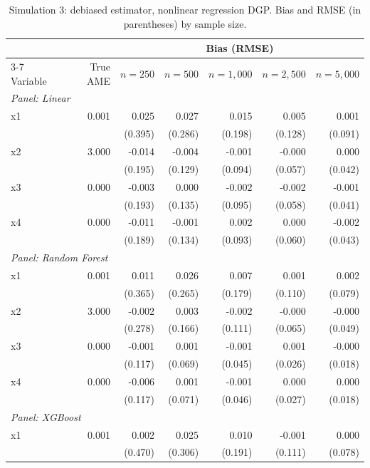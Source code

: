 \begin{table}[htbp]
\centering
\small
\begin{threeparttable}
\caption{Simulation 3: debiased estimator, nonlinear regression DGP. Bias and RMSE (in parentheses) by sample size.}
\label{tab:sim3_bias_regression_nonlinear}
\begin{tabular}{lrrrrrr}
\toprule
 & & \multicolumn{5}{c}{Bias (RMSE)} \\
\cmidrule(lr){3-7}
Variable & True AME & $n=250$ & $n=500$ & $n=1,000$ & $n=2,500$ & $n=5,000$ \\
\midrule
\multicolumn{7}{l}{\textit{Panel: Linear}} \\
\quad x1 & 0.001 & 0.025 & 0.027 & 0.015 & 0.005 & 0.001 \\
 &  & (0.395) & (0.286) & (0.198) & (0.128) & (0.091) \\
\quad x2 & 3.000 & -0.014 & -0.004 & -0.001 & -0.000 & 0.000 \\
 &  & (0.195) & (0.129) & (0.094) & (0.057) & (0.042) \\
\quad x3 & 0.000 & -0.003 & 0.000 & -0.002 & -0.002 & -0.001 \\
 &  & (0.193) & (0.135) & (0.095) & (0.058) & (0.041) \\
\quad x4 & 0.000 & -0.011 & -0.001 & 0.002 & 0.000 & -0.002 \\
 &  & (0.189) & (0.134) & (0.093) & (0.060) & (0.043) \\
\midrule
\multicolumn{7}{l}{\textit{Panel: Random Forest}} \\
\quad x1 & 0.001 & 0.011 & 0.026 & 0.007 & 0.001 & 0.002 \\
 &  & (0.365) & (0.265) & (0.179) & (0.110) & (0.079) \\
\quad x2 & 3.000 & -0.002 & 0.003 & -0.002 & -0.000 & -0.000 \\
 &  & (0.278) & (0.166) & (0.111) & (0.065) & (0.049) \\
\quad x3 & 0.000 & -0.001 & 0.001 & -0.001 & 0.001 & -0.000 \\
 &  & (0.117) & (0.069) & (0.045) & (0.026) & (0.018) \\
\quad x4 & 0.000 & -0.006 & 0.001 & -0.001 & 0.000 & 0.000 \\
 &  & (0.117) & (0.071) & (0.046) & (0.027) & (0.018) \\
\midrule
\multicolumn{7}{l}{\textit{Panel: XGBoost}} \\
\quad x1 & 0.001 & 0.002 & 0.025 & 0.010 & -0.001 & 0.000 \\
 &  & (0.470) & (0.306) & (0.191) & (0.111) & (0.078) \\

\end{tabular}
\end{threeparttable}
\end{table}
